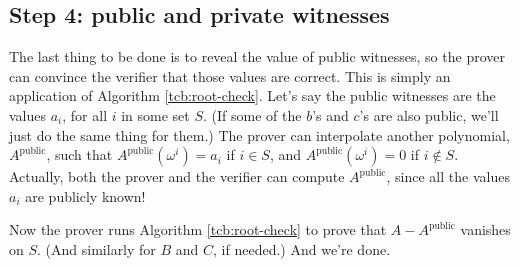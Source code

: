 \subsection{Step 4: public and private witnesses}

The last thing to be done is to reveal the value of public witnesses, so
the prover can convince the verifier that those values are correct. This
is simply an application of Algorithm \ref{tcb:root-check}. Let's say the public
witnesses are the values $a_{i}$, for all $i$ in some set $S$. (If
some of the $b$'s and $c$'s are also public, we'll just do the
same thing for them.) The prover can interpolate another polynomial,
$A^{\text{public}}$, such that
$A^{\text{public}}( \omega^{i} ) = a_{i}$ if $i \in S$,
and $A^{\text{public}}( \omega^{i} ) = 0$ if
$i \notin S$. Actually, both the prover and the verifier can compute
$A^{\text{public}}$, since all the values $a_{i}$ are publicly
known!

Now the prover runs Algorithm \ref{tcb:root-check} to prove that
$A - A^{\text{public}}$ vanishes on $S$. (And similarly for $B$
and $C$, if needed.) And we're done.
